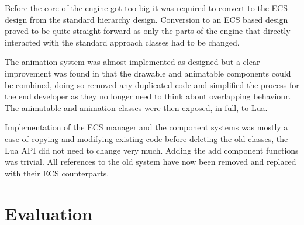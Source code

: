 \documentclass[11pt,a4paper,titlepage]{report}
\begin{document}
	
	Before the core of the engine got too big it was required to convert to the ECS design from the standard hierarchy design. Conversion to an ECS based design proved to be quite straight forward as only the parts of the engine that directly interacted with the standard approach classes had to be changed.

	The animation system was almost implemented as designed but a clear improvement was found in that the drawable and animatable components could be combined, doing so removed any duplicated code and simplified the process for the end developer as they no longer need to think about overlapping behaviour. The animatable and animation classes were then exposed, in full, to Lua.


	Implementation of the ECS manager and the component systems was mostly a case of copying and modifying existing code before deleting the old classes, the Lua API did not need to change very much. Adding the add component functions was trivial. All references to the old system have now been removed and replaced with their ECS counterparts.





















\chapter{Evaluation}


\end{document}
